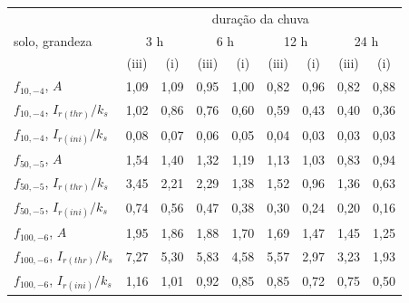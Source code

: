 \begin{tabular}{l|cc|cc|cc|cc}
\toprule
 & \multicolumn{8}{c}{duração da chuva}\\
solo, grandeza & \multicolumn{2}{c|}{3 h} & \multicolumn{2}{c|}{6 h} & \multicolumn{2}{c|}{12 h} & \multicolumn{2}{c}{24 h}\\
 & (iii) & (i) & (iii) & (i) & (iii) & (i) & (iii) & (i)\\
\midrule
$f_{10,-4}$, $A$ & 1{,}09 & 1{,}09 & 0{,}95 & 1{,}00 & 0{,}82 & 0{,}96 & 0{,}82 & 0{,}88\\
$f_{10,-4}$, $I_{r(thr)}/k_s$ & 1{,}02 & 0{,}86 & 0{,}76 & 0{,}60 & 0{,}59 & 0{,}43 & 0{,}40 & 0{,}36\\
$f_{10,-4}$, $I_{r(ini)}/k_s$ & 0{,}08 & 0{,}07 & 0{,}06 & 0{,}05 & 0{,}04 & 0{,}03 & 0{,}03 & 0{,}03\\
\midrule
$f_{50,-5}$, $A$ & 1{,}54 & 1{,}40 & 1{,}32 & 1{,}19 & 1{,}13 & 1{,}03 & 0{,}83 & 0{,}94\\
$f_{50,-5}$, $I_{r(thr)}/k_s$ & 3{,}45 & 2{,}21 & 2{,}29 & 1{,}38 & 1{,}52 & 0{,}96 & 1{,}36 & 0{,}63\\
$f_{50,-5}$, $I_{r(ini)}/k_s$ & 0{,}74 & 0{,}56 & 0{,}47 & 0{,}38 & 0{,}30 & 0{,}24 & 0{,}20 & 0{,}16\\
\midrule
$f_{100,-6}$, $A$ & 1{,}95 & 1{,}86 & 1{,}88 & 1{,}70 & 1{,}69 & 1{,}47 & 1{,}45 & 1{,}25\\
$f_{100,-6}$, $I_{r(thr)}/k_s$ & 7{,}27 & 5{,}30 & 5{,}83 & 4{,}58 & 5{,}57 & 2{,}97 & 3{,}23 & 1{,}93\\
$f_{100,-6}$, $I_{r(ini)}/k_s$ & 1{,}16 & 1{,}01 & 0{,}92 & 0{,}85 & 0{,}85 & 0{,}72 & 0{,}75 & 0{,}50\\
\bottomrule
\end{tabular}
